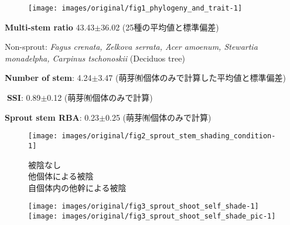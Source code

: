 \documentclass[a0, 25, plainboxedsections]{sciposter} %
\begin{document}
\begin{multicols}{2}

\begin{mdframed}[style=subsection.frame,frametitle={\textbf{\LARGE{Strong variation in stool structure among species}}}]

\vspace{-1.0em}
\begin{figure}
  \centering
    \texttt{[image: images/original/fig1\_phylogeny\_and\_trait-1]}
\end{figure}

\vspace{-1em}
\faCaretRight \textbf{Multi-stem ratio} 43.43$\pm$36.02 {\small (25種の平均値と標準偏差)}


{\small
\hspace*{4.5em}Non-sprout: \textit{Fagus crenata, Zelkova serrata, Acer amoenum, Stewartia monadelpha, Carpinus tschonoskii} (Deciduos tree)

}

\faCaretRight \textbf{Number of stem}: 4.24$\pm$3.47 {\small(萌芽㈲個体のみで計算した平均値と標準偏差)}

\faCaretRight \textbf{SSI}: 0.89$\pm$0.12 {\small(萌芽㈲個体のみで計算)}


\faCaretRight \textbf{Sprout stem RBA}: 0.23$\pm$0.25 {\small(萌芽㈲個体のみで計算)}

\end{mdframed}

\begin{mdframed}[style=subsection.frame,frametitle=\textbf{\LARGE{More highly sprouters are more avoid self-shading}}]

\vspace{-0.5em}
\begin{figure}
 \begin{minipage}{0.25\hsize}
  \centering
   \texttt{[image: images/original/fig2\_sprout\_stem\_shading\_condition-1]}
   
  \vspace{-0.4em}\flushleft 
    {\tiny \textcolor[HTML]{4D4D4D}{\faStop} 被陰なし\\
    \textcolor[HTML]{C0C0C0}{\faStop} 他個体による被陰\\
    \vspace{-1.6em}\textcolor[HTML]{FFFFFF}{\faStop} 自個体内の他幹による被陰}
 \end{minipage}
 \begin{minipage}{0.75\hsize}
  \centering
   \texttt{[image: images/original/fig3\_sprout\_shoot\_self\_shade-1]}
   \texttt{[image: images/original/fig3\_sprout\_shoot\_self\_shade\_pic-1]}
   

\end{minipage}
\end{figure}
\end{mdframed}
\end{multicols}
\end{document}
